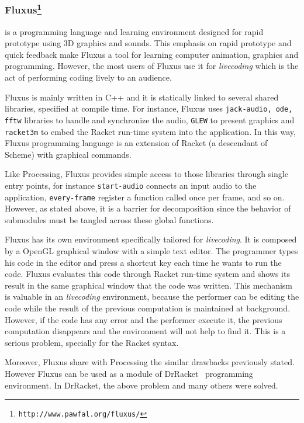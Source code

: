 \subsubsection{Fluxus\protect\footnote{\texttt{http://www.pawfal.org/fluxus/}}} is a programming language and learning environment designed for rapid prototype using 3D graphics and sounds. This emphasis on rapid prototype and quick feedback make Fluxus a tool for learning computer animation, graphics and programming. However, the most users of Fluxus use it for \textit{livecoding} which is the act of performing coding lively to an
audience.

Fluxus is mainly written in C++ and it is statically linked to several shared libraries, specified at compile time. For instance, Fluxus uses \texttt{jack-audio, ode, fftw} libraries to handle and synchronize the audio, \texttt{GLEW} to present graphics and \texttt{racket3m} to embed the Racket run-time system into the application. In this way, Fluxus programming language is an extension of Racket (a descendant of Scheme) with graphical commands. 

Like Processing, Fluxus provides simple access to those libraries through single entry points, for instance \texttt{start-audio} connects an input audio to the application, \texttt{every-frame} register a function called once per frame, and so on. However, as stated above, it is a barrier for decomposition since the behavior of submodules must be tangled across these global functions.

Fluxus has its own environment specifically tailored for \textit{livecoding}. It is composed by a OpenGL graphical window with a simple text editor. The programmer types his code in the editor and press a shortcut key each time he wants to run the code. Fluxus evaluates this code through Racket run-time system and shows its result in the same graphical window that the code was written. This mechanism is valuable in an \textit{livecoding} environment, because the performer can be editing the code while the result of the previous computation is maintained at background. However, if the code has any error and the performer execute it, the previous computation disappears and the environment will not help to find it. This is a serious problem, specially for the Racket syntax.

Moreover, Fluxus share with Processing the similar drawbacks previously stated. However Fluxus can be used as a module of DrRacket~\cite{findler2002drscheme} programming environment. In DrRacket, the above problem and many others were solved.
